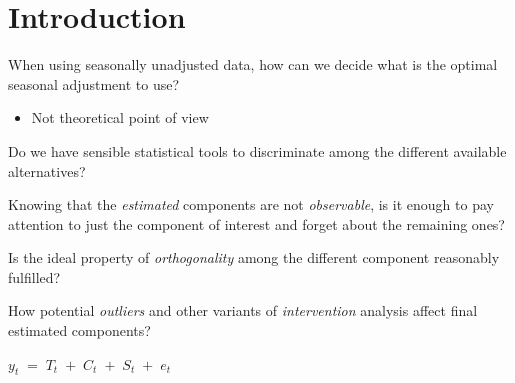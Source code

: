 
 \section{Introduction}
\begin{slide}
  \begin{wideitemize}
  \item <1> When using seasonally unadjusted data, how can we decide what
    is the optimal seasonal adjustment to use?%
    \begin{itemize}
    \item Not theoretical point of view
    \end{itemize}
    
  \item<2> Do we have sensible statistical tools to discriminate among
    the different available alternatives?%
  \item<2> Knowing that the \emph{estimated} components are not
    \emph{observable}, is it enough to pay attention to just the
    component of interest and forget about the remaining ones?%
  \item<2> Is the ideal property of \emph{orthogonality} among the
    different component reasonably fulfilled?
  \item<3> How potential \emph{outliers} and other variants of
    \emph{intervention} analysis affect final estimated components?
  \end{wideitemize}
\end{slide}

\begin{slide}
  
  \begin{center}
    \LARGE
    \begin{math}
      y_t\;=\;T_t\;+\;C_t\;+\;S_t\;+\;e_t %
    \end{math}
  \end{center}
  
\end{slide}


